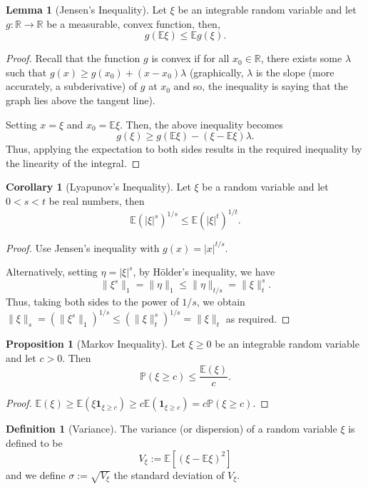 \documentclass[]{article}
\theoremstyle{definition}
\newtheorem{corollary}{Corollary}[theorem]
\theoremstyle{definition}
\newtheorem{definition}{Definition}[section]
\newtheorem{lemma}{Lemma}[section]
\newtheorem{proposition}{Proposition}[section]
\begin{document}
\begin{lemma}[Jensen's Inequality]
  Let \(\xi\) be an integrable random variable and let \(g : \mathbb{R} \to \mathbb{R}\)
  be a measurable, convex function, then,
  \[g(\mathbb{E} \xi) \le \mathbb{E}g(\xi).\]
\end{lemma}
\begin{proof}
  Recall that the function \(g\) is convex if for all \(x_0 \in \mathbb{R}\), there 
  exists some \(\lambda\) such that \(g(x) \ge g(x_0) + (x - x_0) \lambda\)
  (graphically, \(\lambda\) is the slope (more accurately, a subderivative) of 
  \(g\) at \(x_0\) and so, the inequality is saying that the graph lies above the 
  tangent line). 

  Setting \(x = \xi\) and \(x_0 = \mathbb{E}\xi\). Then, the above inequality becomes 
  \[g(\xi) \ge g(\mathbb{E}\xi) - (\xi - \mathbb{E}\xi)\lambda.\]
  Thus, applying the expectation to both sides results in the required inequality 
  by the linearity of the integral.
\end{proof}

\begin{corollary}[Lyapunov's Inequality]
  Let \(\xi\) be a random variable and let \(0 < s < t\) be real numbers, then 
  \[\mathbb{E}(|\xi|^s)^{1 / s} \le \mathbb{E}(|\xi|^t)^{1 / t}.\]
\end{corollary}
\begin{proof}
  Use Jensen's inequality with \(g(x) = |x|^{t / s}\). 

  Alternatively, setting \(\eta = |\xi|^s\), by Hölder's inequality, we have 
  \[\|\xi^s\|_1 =  \|\eta\|_1 \le \|\eta\|_{t / s} = \|\xi\|^s_t.\]
  Thus, taking both sides to the power of \(1 / s\), we obtain 
  \(\|\xi\|_s = (\|\xi^s\|_1)^{1 / s} \le (\|\xi\|^s_t)^{1 / s} = \|\xi\|_t\) as required.
\end{proof}

\begin{proposition}[Markov Inequality]
  Let \(\xi \ge 0\) be an integrable random variable and let \(c > 0\). Then 
  \[\mathbb{P}(\xi \ge c) \le \frac{\mathbb{E}(\xi)}{c}.\]
\end{proposition}
\begin{proof}
  \(\mathbb{E}(\xi) \ge \mathbb{E}(\xi\mathbf{1}_{\xi \ge c}) \ge 
    c \mathbb{E}(\mathbf{1}_{\xi \ge c}) = c\mathbb{P}(\xi \ge c).\)
\end{proof}

\begin{definition}[Variance]
  The variance (or dispersion) of a random variable \(\xi\) is defined to be 
  \[V_\xi := \mathbb{E}[(\xi - \mathbb{E}\xi)^2]\]
  and we define \(\sigma := \sqrt{V_\xi}\) the standard deviation of \(V_\xi\).
\end{definition}
\end{document}
